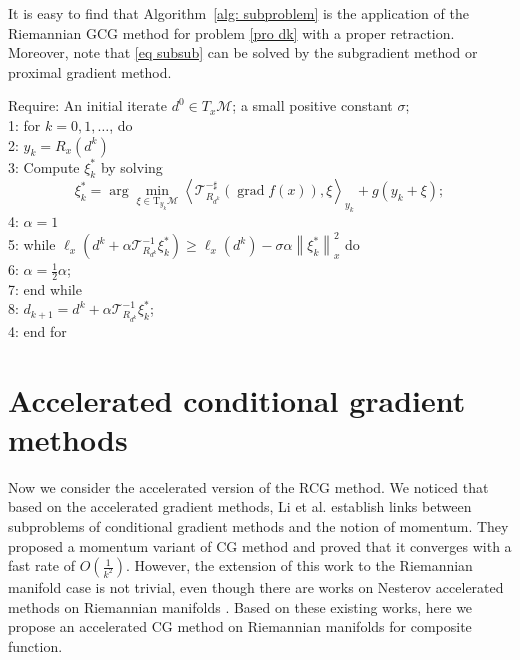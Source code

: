 \documentclass[pdflatex,sn-mathphys-num]{sn-jnl}%
\theoremstyle{definition} %
\theoremstyle{remark} %
\begin{document}
It is easy to find that Algorithm~\ref{alg: subproblem} is the application of the Riemannian GCG method for problem \eqref{pro dk} with a proper retraction. Moreover, note that \eqref{eq subsub} can be solved by the subgradient method or proximal gradient method.





 \begin{algorithm}[H]
      \caption{Solving the subproblem}
      \label{alg: subproblem}
      \noindent Require: An initial iterate $d^0  \in T_{x}\mathcal{M}$; a small positive constant $\sigma$; \\
        1: for $k=0, 1, \ldots$,  do\\
        2: \quad $y_k=R_x\left(d^k\right)$\\
        3: \quad Compute $\xi_k^*$ by solving 
        \begin{equation}\label{eq subsub}
            \xi_k^*=\arg \min _{\xi \in \mathrm{T}_{y_k} \mathcal{M}}  \left\langle\mathcal{T}_{R_{d^k}}^{-\sharp}\left(\operatorname{grad} f(x)\right), \xi\right\rangle_{y_k}+g\left(y_k+\xi\right);
        \end{equation}
        4: \quad$\alpha=1$\\
        5: \quad while \quad$\ell_x\left(d^k+\alpha \mathcal{T}_{R_{d^k}}^{-1} \xi_k^*\right) \geq \ell_x\left(d^k\right)-\sigma \alpha\left\|\xi_k^*\right\|_x^2$ \quad do\\
        6: \quad \quad $\alpha=\frac{1}{2} \alpha $; \\
        7: \quad end while\\
        8: \quad $d_{k+1}=d^k+\alpha \mathcal{T}_{R_{d^k}}^{-1} \xi_k^*$;\\
        4: end for
\end{algorithm}








\section{Accelerated conditional gradient methods}\label{sec: accelerate}
Now we consider the accelerated version of the RCG method. We noticed that based on the accelerated gradient methods, Li et al.  \cite{li2021momentum} establish links between subproblems of conditional gradient methods and the notion of momentum. They proposed a momentum variant of CG method and proved that it converges with a fast rate of $O(\frac{1}{k^2})$. However, the extension of this work to the Riemannian manifold case is not trivial, even though there are works on Nesterov accelerated methods on Riemannian manifolds \cite{alimisis2021momentum}.  Based on these existing works,  here we propose an accelerated CG method on Riemannian manifolds for composite function.
\end{document}

